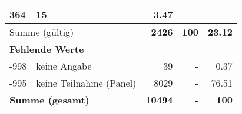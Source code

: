 \begin{longtable}{lXrrr}
       \num{364} &
       \num[round-mode=places,round-precision=2]{15} &
         \num[round-mode=places,round-precision=2]{3.47} \\
     \midrule
     \multicolumn{2}{l}{Summe (gültig)} &
       \textbf{\num{2426}} &
     \textbf{\num{100}} &
       \textbf{\num[round-mode=places,round-precision=2]{23.12}} \\
     \multicolumn{5}{l}{\textbf{Fehlende Werte}}\\
       -998 &
       keine Angabe &
         \num{39} &
        - &
         \num[round-mode=places,round-precision=2]{0.37} \\
       -995 &
       keine Teilnahme (Panel) &
         \num{8029} &
        - &
         \num[round-mode=places,round-precision=2]{76.51} \\
     \midrule
     \multicolumn{2}{l}{\textbf{Summe (gesamt)}} &
          \textbf{\num{10494}} &
        \textbf{-} &
        \textbf{\num{100}} \\
     \bottomrule
     \end{longtable}
     
